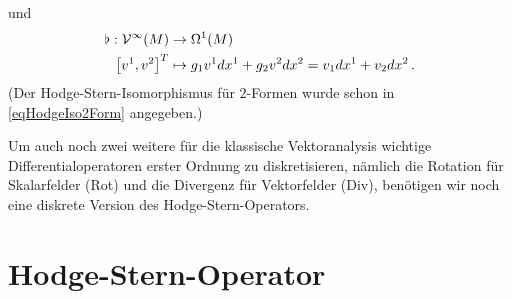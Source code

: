   und
  \begin{align}
    \begin{aligned}
      \flat: \mathcal{V}^{\infty}(M) &\rightarrow \Omega^{1}(M) \\
             \left[ v^{1}, v^{2} \right]^{T} &\mapsto g_{1}v^{1} dx^{1} + g_{2}v^{2} dx^{2} = v_{1} dx^{1} + v_{2} dx^{2} \,\text{.}
    \end{aligned}
  \end{align}
  (Der Hodge-Stern-Isomorphismus für \( 2 \)-Formen wurde schon in \eqref{eqHodgeIso2Form} angegeben.)
  
  Um auch noch zwei weitere für die klassische Vektoranalysis wichtige Differentialoperatoren erster Ordnung zu diskretisieren,
  nämlich die Rotation für Skalarfelder (Rot) und die Divergenz für Vektorfelder (Div), 
  benötigen wir noch eine diskrete Version des Hodge-Stern-Operators.
 

  

  

  

\section{Hodge-Stern-Operator}

